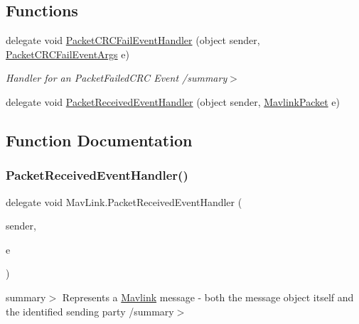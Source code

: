 \subsection*{Functions}
\begin{DoxyCompactItemize}
\item 
\mbox{\label{namespaceMavLink_a8ed8a6701876b63e5bb9135a9897d679}} 
delegate void \hyperlink{namespaceMavLink_a8ed8a6701876b63e5bb9135a9897d679}{Packet\+C\+R\+C\+Fail\+Event\+Handler} (object sender, \hyperlink{classMavLink_1_1PacketCRCFailEventArgs}{Packet\+C\+R\+C\+Fail\+Event\+Args} e)
\begin{DoxyCompactList}\small\item\em Handler for an Packet\+Failed\+C\+RC Event /summary$>$ \end{DoxyCompactList}\item 
delegate void \hyperlink{namespaceMavLink_a78c17c9f049257b0626c8d377735666d}{Packet\+Received\+Event\+Handler} (object sender, \hyperlink{classMavLink_1_1MavlinkPacket}{Mavlink\+Packet} e)
\end{DoxyCompactItemize}


\subsection{Function Documentation}
\mbox{\label{namespaceMavLink_a78c17c9f049257b0626c8d377735666d}} 
\subsubsection{\texorpdfstring{Packet\+Received\+Event\+Handler()}{PacketReceivedEventHandler()}}
{\footnotesize\ttfamily delegate void Mav\+Link.\+Packet\+Received\+Event\+Handler (\begin{DoxyParamCaption}\item[{object}]{sender,  }\item[{\hyperlink{classMavLink_1_1MavlinkPacket}{Mavlink\+Packet}}]{e }\end{DoxyParamCaption})}

summary$>$ Represents a \hyperlink{classMavLink_1_1Mavlink}{Mavlink} message -\/ both the message object itself and the identified sending party /summary$>$ 